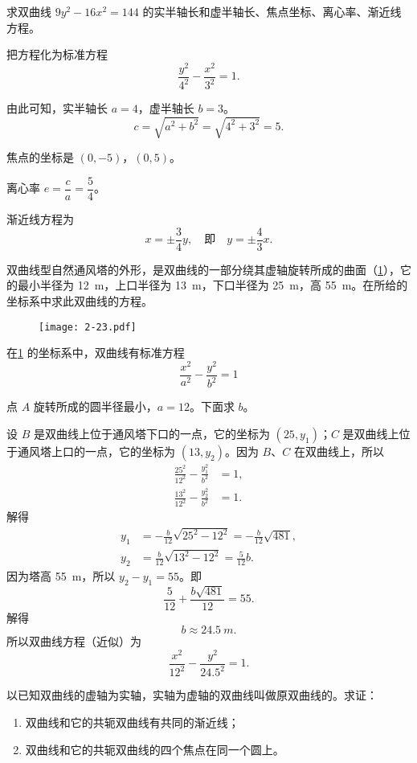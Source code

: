 \begin{example}
  求双曲线 $9y^2-16x^2=144$ 的实半轴长和虚半轴长、焦点坐标、离心率、渐近线方程。
\end{example}
\begin{solution}
  把方程化为标准方程
  \[ \frac{y^2}{4^2}-\frac{x^2}{3^2}=1. \]
  
  由此可知，实半轴长 $a=4$，虚半轴长 $b=3$。
  \[c = \sqrt{{a}^{2} + {b}^{2}} = \sqrt{{4}^{2} + {3}^{2}} = 5.\]
  
  焦点的坐标是 $(0,-5)$，$(0,5)$。

  离心率 $e=\dfrac{c}{a}=\dfrac{5}{4}$。

  渐近线方程为
  \[x=\pm\frac{3}{4}y,\quad\text{即}\quad y=\pm\frac{4}{3}x.\]
\end{solution}
\begin{example}
  双曲线型自然通风塔的外形，是双曲线的一部分绕其虚轴旋转所成的曲面（\cref{fig:2-23}），它的最小半径为 \qty{12}{m}，上口半径为 \qty{13}{m}，下口半径为 \qty{25}{m}，高 \qty{55}{m}。在所给的坐标系中求此双曲线的方程。
\end{example}
\begin{figure}
  \texttt{[image: 2-23.pdf]}
  \caption{}\label{fig:2-23}
\end{figure}
\begin{solution}
  在\cref{fig:2-23} 的坐标系中，双曲线有标准方程
  \[\frac{x^2}{a^2}-\frac{y^2}{b^2}=1\]
  
  点 $A$ 旋转所成的圆半径最小，$a=12$。下面求 $b$。

设 $B$ 是双曲线上位于通风塔下口的一点，它的坐标为 $(25,y_1)$；$C$ 是双曲线上位于通风塔上口的一点，它的坐标为 $(13,y_2)$。因为 $B$、$C$ 在双曲线上，所以
\begin{align*}
  \frac{25^2}{12^2} -\frac{y_1^2}{b^2}&= 1,\\
  \frac{13^2}{12^2} -\frac{y_2^2}{b^2}&= 1.
\end{align*}
解得
\begin{align*}
  y_1&=-\frac{b}{12}\sqrt{25^2-12^2}=-\frac{b}{12}\sqrt{481},\\
  y_2&=\frac{b}{12}\sqrt{13^2-12^2}=\frac{5}{12}b.
\end{align*}
因为塔高 \qty{55}{m}，所以 $y_2-y_1=55$。即
\[\frac{5}{12}+\frac{b\sqrt{481}}{12}=55.\]
解得
\[b \approx \qty{24.5}{m}.\]
所以双曲线方程（近似）为
\[\frac{x^2}{12^2}-\frac{y^2}{24.5^2}=1.\]
\end{solution}
\begin{example}
  以已知双曲线的虚轴为实轴，实轴为虚轴的双曲线叫做原双曲线的。求证：
  \begin{enumerate}
    \item 双曲线和它的共轭双曲线有共同的渐近线；
    \item 双曲线和它的共轭双曲线的四个焦点在同一个圆上。
  \end{enumerate}
\end{example}

